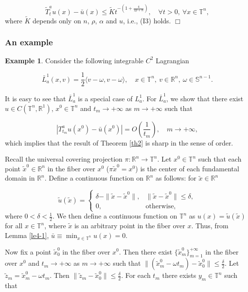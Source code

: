 \documentclass{amsart}[12pt]
\theoremstyle{definition}
\newtheorem{example}[theorem]{Example}
\theoremstyle{remark}
\numberwithin{equation}{section}
\begin{document}
\[
\tilde{T}^a_tu(x)-\bar{u}(x)\leq
\tilde{K}t^{-(1+\frac{4}{2\rho+n})}, \quad \forall t>0,\ \forall
x\in\mathbb{T}^n,
\]
where $\tilde{K}$ depends only on $n$, $\rho$, $\alpha$ and $u$,
i.e., (I3) holds. \hfill $\Box$

\subsubsection{An example}
\begin{example}\label{ex1}
Consider the following integrable $C^2$ Lagrangian

\[
\bar{L}^1_a(x,v)=\frac{1}{2}\langle v-\omega,v-\omega\rangle,
\quad x\in\mathbb{T}^n,\ v\in\mathbb{R}^n,\
\omega\in\mathbb{S}^{n-1}.
\]
\end{example}
It is easy to see that $\bar{L}^1_a$ is a special case of $L^1_a$.
For $\bar{L}^1_a$, we show that there exist $u\in
C(\mathbb{T}^n,\mathbb{R}^1)$, $x^0\in\mathbb{T}^n$ and
$t_m\to+\infty$ as $m\to+\infty$ such that

\[
|T^a_{t_m}u(x^0)-\bar{u}(x^0)|=O(\frac{1}{t_m}), \quad
m\to+\infty,
\]
which implies that the result of Theorem \ref{th2} is sharp in the
sense of order.

Recall the universal covering projection
$\pi:\mathbb{R}^n\to\mathbb{T}^n$. Let $x^0\in\mathbb{T}^n$ such
that each point $\tilde{x}^0\in\mathbb{R}^n$ in the fiber over
$x^0$ ($\pi\tilde{x}^0=x^0$) is the center of each fundamental
domain in $\mathbb{R}^n$. Define a continuous function on
$\mathbb{R}^n$ as follows: for $\tilde{x}\in\mathbb{R}^n$

\[
\tilde{u}(\tilde{x})=\left\{
                         \begin{array}{ll}
                         \delta-\|\tilde{x}-\tilde{x}^0\|, &
                         \|\tilde{x}-\tilde{x}^0\|\leq\delta,\\
                         0, & \mathrm{otherwise},
                         \end{array}
                         \right.
\]
where $0<\delta<\frac{1}{2}$. We then define a continuous function
on $\mathbb{T}^n$ as $u(x)=\tilde{u}(\tilde{x})$ for all
$x\in\mathbb{T}^n$, where $\tilde{x}$ is an arbitrary point in the
fiber over $x$. Thus, from Lemma \ref{le4-1},
$\bar{u}\equiv\min_{x\in\mathbb{T}^n}u(x)=0$.

Now fix a point $\tilde{x}^0_0$ in the fiber over $x^0$. Then
there exist $\{\tilde{x}^0_m\}_{m=1}^{+\infty}$ in the fiber over
$x^0$ and $t_m\to+\infty$ as $m\to+\infty$ such that
$\|(\tilde{x}^0_m-\omega
t_m)-\tilde{x}^0_0\|\leq\frac{\delta}{2}$. Let
$\tilde{z}_m=\tilde{x}^0_m-\omega t_m$. Then
$\|\tilde{z}_m-\tilde{x}^0_0\|\leq\frac{\delta}{2}$. For each
$t_m$ there exists $y_m\in\mathbb{T}^n$ such that
\end{document}
